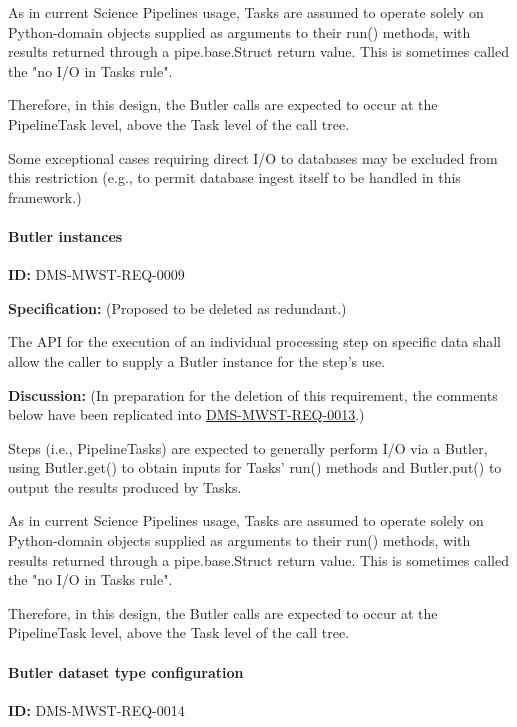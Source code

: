 \documentclass[SE,toc,lsstdraft]{lsstdoc}
\begin{document}
As in current Science Pipelines usage, Tasks are assumed to operate solely on Python-domain objects supplied as arguments to their run() methods, with results returned through a pipe.base.Struct return value. This is sometimes called the "no I/O in Tasks rule".

Therefore, in this design, the Butler calls are expected to occur at the PipelineTask level, above the Task level of the call tree.

Some exceptional cases requiring direct I/O to databases may be excluded from this restriction (e.g., to permit database ingest itself to be handled in this framework.)

\paragraph{Butler instances}\hfill  %

\label{DMS-MWST-REQ-0009}
\textbf{ID:} DMS-MWST-REQ-0009

\textbf{Specification:}
(Proposed to be deleted as redundant.)

The API for the execution of an individual processing step on specific data shall allow the caller to supply a Butler instance for the step's use.

\textbf{Discussion:}
(In preparation for the deletion of this requirement, the comments below have been replicated into \hyperref[DMS-MWST-REQ-0013]{DMS-MWST-REQ-0013}.)

Steps (i.e., PipelineTasks) are expected to generally perform I/O via a Butler, using Butler.get() to obtain inputs for Tasks' run() methods and Butler.put() to output the results produced by Tasks.

As in current Science Pipelines usage, Tasks are assumed to operate solely on Python-domain objects supplied as arguments to their run() methods, with results returned through a pipe.base.Struct return value. This is sometimes called the "no I/O in Tasks rule".

Therefore, in this design, the Butler calls are expected to occur at the PipelineTask level, above the Task level of the call tree.

\paragraph{Butler dataset type configuration}\hfill  %

\label{DMS-MWST-REQ-0014}
\textbf{ID:} DMS-MWST-REQ-0014
\end{document}
